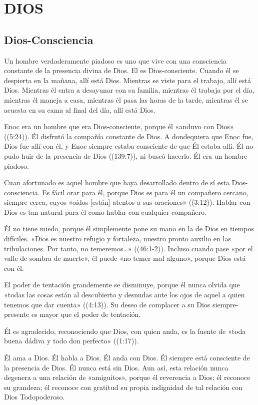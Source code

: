 \documentclass[12pt, twoside, openright]{book}
\begin{document}
\chapter{DIOS}

\section{Dios-Consciencia}
Un hombre verdaderamente piadoso es uno que vive con una consciencia constante de la presencia divina de Dios. El es Dios-consciente. Cuando él se despierta en la mañana, allí está Dios. Mientras se viste para el trabajo, allí está Dios. Mientras él entra a desayunar con su familia, mientras él trabaja por el día, mientras él maneja a casa, mientras él pasa las horas de la tarde, mientras él se acuesta en su cama al final del día, allí está Dios. 

Enoc era un hombre que era Dios-consciente, porque él «anduvo con Dios» ((5:24)). Él disfrutó la compañía constante de Dios. A dondequiera que Enoc fue, Dios fue allí con él, y Enoc siempre estaba consciente de que Él estaba allí. Él no pudo huir de la presencia de Dios ((139:7)), ni buscó hacerlo. Él era un hombre piadoso.

Cuan afortunado es aquel hombre que haya desarrollado dentro de sí esta Dios-consciencia. Es fácil orar para él, porque Dios es para él un compañero cercano, siempre cerca, cuyos «oídos [están] atentos a sus oraciones» ((3:12)). Hablar con Dios es tan natural para él como hablar con cualquier compañero.

Él no tiene miedo, porque él simplemente pone su mano en la de Dios en tiempos difíciles. «Dios es nuestro refugio y fortaleza, nuestro pronto auxilio en las tribulaciones. Por tanto, no temeremos\ldots» ((46:1-2)). Incluso cuando pase «por el valle de sombra de muerte», él puede «no temer mal alguno», porque Dios está con él. 

El poder de tentación grandemente se disminuye, porque él nunca olvida que «todas las cosas están al descubierto y desnudas ante los ojos de aquel a quien tenemos que dar cuenta» ((4:13)). Su deseo de complacer a su Dios siempre-presente es mayor que el poder de tentación. 

Él es agradecido, reconociendo que Dios, con quien anda, es la fuente de «toda buena dádiva y todo don perfecto» ((1:17)).

Él ama a Dios. Él habla a Dios. Él anda con Dios. Él siempre está consciente de la presencia de Dios. Él nunca está sin Dios. Aun así, esta relación nunca degenera a una relación de «amiguitos», porque él reverencia a Dios; él reconoce su grandeza; él reconoce con gratitud su propia indignidad de tal relación con Dios Todopoderoso. 
\end{document}
